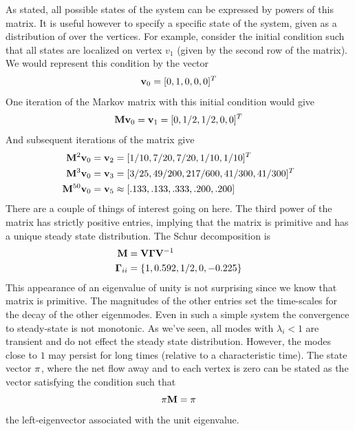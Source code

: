 As stated, all possible states of the system can be expressed by powers of this matrix. It is useful however to specify a specific state of the system, given as a distribution of over the vertices. For example, consider the initial condition such that all states are localized on vertex $v_1$ (given by the second row of the matrix). We would represent this condition by the vector
\begin{equation}
  {\bf v}_0 = [0,1,0,0,0]^T
\end{equation}
One iteration of the Markov matrix with this initial condition would give
\begin{equation}
  {\bf M} {\bf v}_0 = {\bf v}_1 = [0,1/2,1/2,0,0]^T
\end{equation}
And subsequent iterations of the matrix give
\begin{align}
  {\bf M}^2 {\bf v}_0    &= {\bf v}_2  = [1/10,7/20,7/20,1/10,1/10]^T \\
  {\bf M}^3 {\bf v}_0    &= {\bf v}_3  = [3/25,49/200,217/600,41/300,41/300]^T \\
  {\bf M}^{50} {\bf v}_0 &= {\bf v}_5 \approx [.133, .133, .333, .200, .200]
\end{align}
There are a couple of things of interest going on here. The third power of the matrix has strictly positive entries, implying that the matrix is primitive and has a unique steady state distribution. The Schur decomposition is
\begin{align}
  {\bf M}           &= {\bf V} {\bf \Gamma} {\bf V}^{-1} \\
  {\bf \Gamma}_{ii} &= \{ 1, 0.592, 1/2, 0, -0.225 \}
\end{align}
This appearance of an eigenvalue of unity is not surprising since we know that matrix is primitive. The magnitudes of the other entries set the time-scales for the decay of the other eigenmodes. Even in such a simple system the convergence to steady-state is not monotonic. As we've seen, all modes with $\lambda_i < 1$ are transient and do not effect the steady state distribution. However, the modes close to $1$ may persist for long times (relative to a characteristic time). The state vector ${\bf \pi}$, where the net flow away and to each vertex is zero can be stated as the vector satisfying the condition such that
\begin{equation}
  {\bf \pi} {\bf M} = {\bf \pi}
\end{equation} 
\ie the left-eigenvector associated with the unit eigenvalue.



